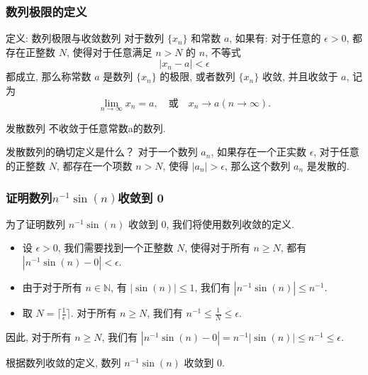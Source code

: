 \documentclass[
10pt, 
aspectratio=43, 
]{beamer}
\begin{document}
\subsubsection{数列极限的定义}
\begin{frame}
\begin{block}{定义: 数列极限与收敛数列}
对于数列 $\{x_n\}$ 和常数 $a$, 如果有: 对于任意的 $\epsilon>0$, 都存在正整数 $N$, 使得对于任意满足 $n>N$ 的 $n$, 不等式
$$|x_n-a|<\epsilon$$
都成立, 
那么称常数 $a$ 是数列 $\{x_n\}$ 的极限, 或者数列 $\{x_n\}$ 收敛, 并且收敛于 $a$, 记为
\begin{equation*}
\lim_{n\to\infty}x_n=a,  \quad \text{或} \quad x_n\to a (n\to\infty).
\end{equation*}
\end{block}
\pause
\begin{block}{发散数列}
不收敛于任意常数a的数列. 
\end{block}
\pause
\begin{exampleblock}{发散数列的确切定义是什么？}
对于一个数列 ${a_n}$, 如果存在一个正实数 $\epsilon$, 对于任意的正整数 $N$, 都存在一个项数 $n>N$, 使得 $|a_n|>\epsilon$, 那么这个数列 ${a_n}$ 是发散的. 
\end{exampleblock}
\end{frame}


\begin{frame}
\frametitle{证明数列$n^{-1}\sin(n)$收敛到 0}

为了证明数列 $n^{-1}\sin(n)$ 收敛到 0, 我们将使用数列收敛的定义. 

\pause

\begin{itemize}
\item 设 $\epsilon > 0$, 我们需要找到一个正整数 $N$, 使得对于所有 $n \geq N$, 都有 $|n^{-1}\sin(n) - 0| < \epsilon$. 

\pause

\item 由于对于所有 $n \in \mathbb{N}$, 有 $|\sin(n)| \leq 1$, 我们有 $|n^{-1}\sin(n)| \leq n^{-1}$. 

\pause

\item 取 $N = \lceil \frac{1}{\epsilon} \rceil$. 对于所有 $n \geq N$, 我们有 $n^{-1} \leq \frac{1}{N} \leq \epsilon$. 


\end{itemize}

\pause

因此, 对于所有 $n \geq N$, 我们有 $|n^{-1}\sin(n) - 0| = n^{-1}|\sin(n)| \leq n^{-1} \leq \epsilon$. 

\pause

根据数列收敛的定义, 数列 $n^{-1}\sin(n)$ 收敛到 0. 

\end{frame}
\end{document}
